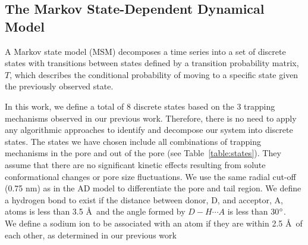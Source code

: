 \documentclass[aps,pre,preprint,groupedaddress]{revtex4-2}
\begin{document}


  \subsection{The Markov State-Dependent Dynamical Model}\label{method:MSMs}  

  A Markov state model (MSM) decomposes a time series into a set of discrete states
  with transitions between states defined by a transition probability matrix, $T$,
  which describes the conditional probability of moving to a specific state given
  the previously observed state.~\cite{pande_everything_2010,wehmeyer_introduction_2018}

  In this work, we define a total of 8 discrete states based on the 3 trapping
  mechanisms observed in our previous work. Therefore, there is no need to 
  apply any algorithmic approaches to identify and decompose our system into 
  discrete states. The states we have chosen include all combinations of trapping
  mechanisms in the pore and out of the pore (see Table~\ref{table:states}). They
  assume that there are no significant kinetic effects resulting from solute 
  conformational changes or pore size fluctuations. We use the same radial cut-off
  (0.75 nm) as in the AD model to differentiate the pore and tail region.  We define 
  a hydrogen bond to exist if the distance between donor, D, and acceptor, A, 
  atoms is less than 3.5 \AA~and the angle formed by $D-H \cdots A$ is less than
  30$\degree$.~\cite{luzar_effect_1996} We define a sodium ion to be associated 
  with an atom if they are within 2.5 \AA~of each other, as determined in our 
  previous work~\cite{coscia_chemically_2019}
  
\end{document}
